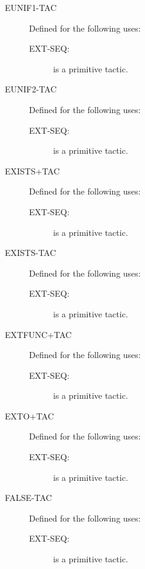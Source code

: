 \begin{description}
\begin{description}
\end{description}

\item[EUNIF1-TAC]  Defined for the following uses:
\begin{description}
\item[EXT-SEQ:]  is a primitive tactic.

\end{description}

\item[EUNIF2-TAC]  Defined for the following uses:
\begin{description}
\item[EXT-SEQ:]  is a primitive tactic.

\end{description}

\item[EXISTS+TAC]  Defined for the following uses:
\begin{description}
\item[EXT-SEQ:]  is a primitive tactic.

\end{description}

\item[EXISTS-TAC]  Defined for the following uses:
\begin{description}
\item[EXT-SEQ:]  is a primitive tactic.

\end{description}

\item[EXTFUNC+TAC]  Defined for the following uses:
\begin{description}
\item[EXT-SEQ:]  is a primitive tactic.

\end{description}

\item[EXTO+TAC]  Defined for the following uses:
\begin{description}
\item[EXT-SEQ:]  is a primitive tactic.

\end{description}

\item[FALSE-TAC]  Defined for the following uses:
\begin{description}
\item[EXT-SEQ:]  is a primitive tactic.


\end{description}
\end{description}
